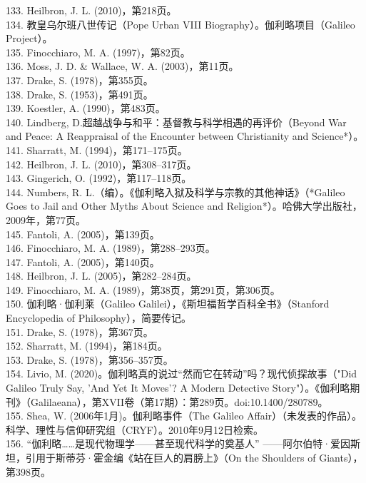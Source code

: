 133. Heilbron, J. L. (2010)，第218页。\\
134. 教皇乌尔班八世传记（Pope Urban VIII Biography）。伽利略项目（Galileo Project）。\\
135. Finocchiaro, M. A. (1997)，第82页。\\ 
136. Moss, J. D. & Wallace, W. A. (2003)，第11页。\\
137. Drake, S. (1978)，第355页。\\
138. Drake, S. (1953)，第491页。\\
139. Koestler, A. (1990)，第483页。\\
140. Lindberg, D.超越战争与和平：基督教与科学相遇的再评价（Beyond War and Peace: A Reappraisal of the Encounter between Christianity and Science*）。\\
141. Sharratt, M. (1994)，第171–175页。\\
142. Heilbron, J. L. (2010)，第308–317页。\\
143. Gingerich, O. (1992)，第117–118页。\\
144. Numbers, R. L.（编）。《伽利略入狱及科学与宗教的其他神话》（*Galileo Goes to Jail and Other Myths About Science and Religion*）。哈佛大学出版社，2009年，第77页。 \\
145. Fantoli, A. (2005)，第139页。\\
146. Finocchiaro, M. A. (1989)，第288–293页。\\
147. Fantoli, A. (2005)，第140页。\\
148. Heilbron, J. L. (2005)，第282–284页。\\
149. Finocchiaro, M. A. (1989)，第38页，第291页，第306页。\\
150. 伽利略·伽利莱（Galileo Galilei），《斯坦福哲学百科全书》（Stanford Encyclopedia of Philosophy），简要传记。\\
151. Drake, S. (1978)，第367页。\\
152. Sharratt, M. (1994)，第184页。\\
153. Drake, S. (1978)，第356–357页。\\
154. Livio, M. (2020)。伽利略真的说过“然而它在转动”吗？现代侦探故事（"Did Galileo Truly Say, 'And Yet It Moves'? A Modern Detective Story"）。《伽利略期刊》（Galilaeana），第XVII卷（第17期）：第289页。doi:10.1400/280789。\\
155. Shea, W. (2006年1月)。伽利略事件（The Galileo Affair）（未发表的作品）。科学、理性与信仰研究组（CRYF）。2010年9月12日检索。\\
156. “伽利略……是现代物理学——甚至现代科学的奠基人” ——阿尔伯特·爱因斯坦，引用于斯蒂芬·霍金编《站在巨人的肩膀上》（On the Shoulders of Giants），第398页。\\
